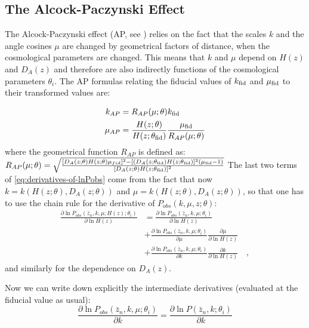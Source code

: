 \subsection{The Alcock-Paczynski Effect\label{sub:The-Alcock-Paczynski-Effect}}

The Alcock-Paczynski effect (AP, see \citep{alcock1979anevolution}) relies on the fact that the scales
$k$ and the angle cosines $\mu$ are changed by geometrical factors
of distance, when the cosmological parameters are changed. This means
that $k$ and $\mu$ depend on $H(z)$ and $D_{A}(z)$ and therefore
are also indirectly functions of the cosmological parameters $\theta_{i}$.
The AP formulas relating the fiducial values of $k_{\rm fid}$ and $\mu_{\rm fid}$
to their transformed values are:

\begin{align}
k_{AP} & = R_{AP}(\mu;\theta)k_{\rm fid}\\
\mu_{AP} & =\frac{H(z;\theta)}{H(z;\theta_{\rm fid})}\frac{\mu_{\rm fid}}{R_{AP}(\mu;\theta)}
\end{align}
where the geometrical function $R_{AP}$ is defined as:
\beeqp$
R_{AP}(\mu;\theta)=\sqrt{\frac{[D_{A}(z;\theta)H(z;\theta)\mu_{fid}]^{2}-[(D_{A}(z;\theta_{\rm fid})
		H(z;\theta_{\rm fid})]^{2}(\mu_{\rm fid}-1)}{[D_{A}(z;\theta)H(z;\theta_{\rm fid})]^{2}}}
$
The last two terms of \cref{eq:derivatives-of-lnPobs} come from
the fact that now $k=k(H(z;\theta),D_{A}(z;\theta))$ and $\mu=k(H(z;\theta),D_{A}(z;\theta))$,
so that one has to use the chain rule for the derivative of $P_{obs}(k,\mu,z;\theta)$:
\begin{align}
\frac{\partial\ln P_{obs}\left(\bar{z}_n,k,\mu;H(z);\theta_{i}\right)}{\partial\ln H(z)} 
& =\frac{\partial\ln P_{obs}\left(\bar{z}_n,k,\mu;\theta_{i}\right)}{\partial\ln H(z)}\\
& +\frac{\partial\ln P_{obs}\left(\bar{z}_n,k,\mu;\theta_{i}\right)}{\partial\mu}\frac{\partial\mu}{\partial\ln H(z)} \nonumber \\ 
& +\frac{\partial\ln P_{obs}\left(\bar{z}_n,k,\mu;\theta_{i}\right)}{\partial k}\frac{\partial k}{\partial\ln H(z)}\nonumber \quad,
\end{align}
and similarly for the dependence on $D_{A}(z)$.

Now we can write down explicitly the intermediate derivatives (evaluated
at the fiducial value as usual):
\begin{equation}
\frac{\partial\ln P_{obs}\left(\bar{z}_n,k,\mu;\theta_{i}\right)}{\partial k}=\frac{\partial\ln P\left(\bar{z}_n,k;\theta_{i}\right)}{\partial k}
\end{equation}


